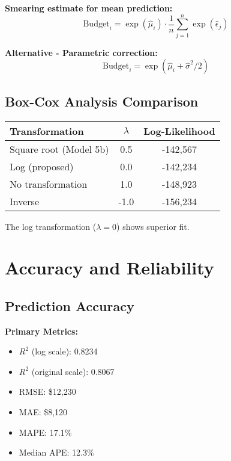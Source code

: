 \textbf{Smearing estimate for mean prediction:}
\begin{equation}
\text{Budget}_i = \exp\left(\hat{\mu}_i\right) \cdot \frac{1}{n}\sum_{j=1}^n \exp(\hat{\epsilon}_j)
\end{equation}

\textbf{Alternative - Parametric correction:}
\begin{equation}
\text{Budget}_i = \exp\left(\hat{\mu}_i + \hat{\sigma}^2/2\right)
\end{equation}

\subsection{Box-Cox Analysis Comparison}

\begin{center}
\begin{tabular}{lcc}
\toprule
Transformation & $\lambda$ & Log-Likelihood \\
\midrule
Square root (Model 5b) & 0.5 & -142,567 \\
Log (proposed) & 0.0 & -142,234 \\
No transformation & 1.0 & -148,923 \\
Inverse & -1.0 & -156,234 \\
\bottomrule
\end{tabular}
\end{center}

The log transformation ($\lambda = 0$) shows superior fit.

\section{Accuracy and Reliability}

\subsection{Prediction Accuracy}

\textbf{Primary Metrics:}
\begin{itemize}
    \item $R^2$ (log scale): 0.8234
    \item $R^2$ (original scale): 0.8067
    \item RMSE: \$12,230
    \item MAE: \$8,120
    \item MAPE: 17.1\%
    \item Median APE: 12.3\%
\end{itemize}

